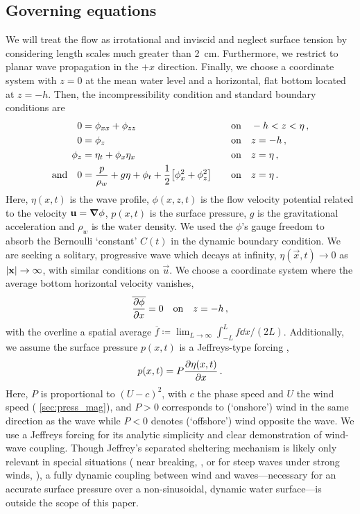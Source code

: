 \documentclass{jfm}
\begin{document}
\subsection{Governing equations}
We will treat the flow as irrotational and inviscid and neglect surface
tension by considering length scales much greater than
\SI{2}{\centi\meter}.
Furthermore, we restrict to planar wave propagation in the $+x$
direction.
Finally, we choose a coordinate system with $z=0$ at the mean water
level and a horizontal, flat bottom located at $z=-h$.
Then, the incompressibility condition and standard boundary conditions
are
\begin{alignat}{2}
  0 &= \phi_{xx} + \phi_{zz} &&\qq{on}
  -h < z < \eta \,, \label{eq:laplace}\\
  0 &= \phi_{z} &&\qq{on} z=-h \,, \label{eq:bottom_bc}\\
  \phi_{z} &= \eta_{t} + \phi_{x} \eta_{x} &&\qq{on} z = \eta \,,
  \label{eq:kinematic_bc}\\
  \qq*{and} 0 &= \frac{p}{\rho_w} + g\eta + \phi_{t} +
  \frac{1}{2} \bqty{\phi_{x}^2 + \phi_{z}^2} &&\qq{on} z=
  \eta \,. \label{eq:dynamic_bc}
\end{alignat}
Here, $\eta(x,t)$ is the wave profile, $\phi(x,z,t)$ is the flow
velocity potential related to the velocity $\mathbf{\bm{u}} = \grad{\phi}$,
$p(x,t)$ is the surface pressure, $g$ is the gravitational acceleration
and $\rho_w$ is the water density.
We used the $\phi$'s gauge freedom to absorb the Bernoulli `constant'
$C(t)$ in the dynamic boundary condition.
We are seeking a solitary, progressive wave which decays at infinity,
$\eta(\vec{x},t) \to 0$ as $\abs{\mathbf{\bm{x}}} \to \infty$, with similar
conditions on $\vec{u}$.
We choose a coordinate system where the average bottom horizontal
velocity vanishes,
\begin{equation}
  \overline{ \pdv{\phi}{x} } = 0 \qq{on} z=-h \,,
  \label{eq:bot_bc_horz}
\end{equation}
with the overline a spatial average $\overline{f} \coloneqq
\lim_{L\to\infty} \int_{-L}^{L} f \dd{x} / (2L)$.
Additionally, we assume the surface pressure $p(x,t)$ is a Jeffreys-type
forcing \citep{jeffreys1925formation},
\begin{equation}
  p(x,t) = P \pdv{\eta(x,t)}{x} \,.
\end{equation}
Here, $P$ is proportional to $(U-c)^2$, with $c$ the phase speed and $U$
the wind speed (\cf{} \cref{sec:press_mag}), and $P>0$ corresponds to
(`onshore') wind in the same direction as the wave while $P<0$ denotes
(`offshore') wind opposite the wave.
We use a Jeffreys forcing for its analytic simplicity and clear
demonstration of wind-wave coupling.
Though Jeffrey's separated sheltering mechanism is likely only relevant
in special situations (\eg{} near breaking,
\citealp{banner1976separation}, or for steep waves under strong winds,
\citealp{tian2013evolution,touboul2006interaction}),
a fully dynamic coupling between wind and waves---necessary for an
accurate surface pressure over a non-sinusoidal, dynamic water
surface---is outside the scope of this paper.
\end{document}
